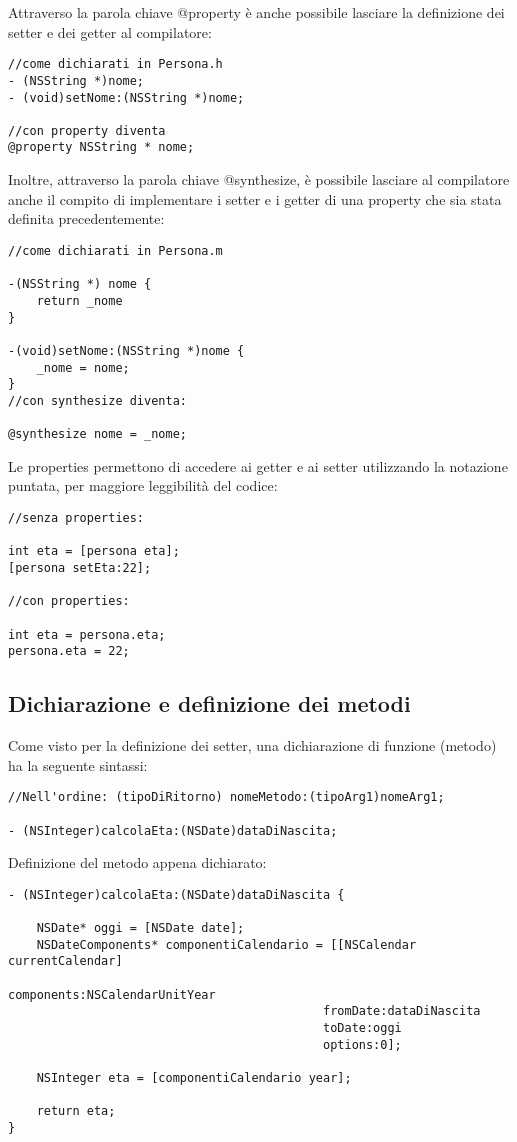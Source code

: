 \bigskip
\bigskip
\bigskip
Attraverso la parola chiave @property è anche possibile lasciare la definizione dei setter e dei getter al compilatore:
\lstset{language=[Objective]C, breakindent=40pt, breaklines}
\begin{lstlisting}
//come dichiarati in Persona.h
- (NSString *)nome;
- (void)setNome:(NSString *)nome;

//con property diventa
@property NSString * nome;
\end{lstlisting}
\bigskip
\bigskip
\bigskip
Inoltre, attraverso la parola chiave @synthesize, è possibile lasciare al compilatore anche il compito di implementare i setter e i getter di una property che sia stata definita precedentemente:
\lstset{language=[Objective]C, breakindent=40pt, breaklines}
\begin{lstlisting}
//come dichiarati in Persona.m

-(NSString *) nome {
	return _nome
}

-(void)setNome:(NSString *)nome {
	_nome = nome;
}
//con synthesize diventa:

@synthesize nome = _nome; 
\end{lstlisting}
Le properties permettono di accedere ai getter e ai setter utilizzando la notazione puntata, per maggiore leggibilità del codice:
\lstset{language=[Objective]C, breakindent=40pt, breaklines}
\begin{lstlisting}
//senza properties: 

int eta = [persona eta]; 
[persona setEta:22]; 

//con properties: 

int eta = persona.eta;
persona.eta = 22;
\end{lstlisting}
\newpage
\subsection{Dichiarazione e definizione dei metodi}
Come visto per la definizione dei setter, una dichiarazione di funzione (metodo) ha la seguente sintassi: 
\lstset{language=[Objective]C, breakindent=40pt, breaklines}
\begin{lstlisting}
//Nell'ordine: (tipoDiRitorno) nomeMetodo:(tipoArg1)nomeArg1;

- (NSInteger)calcolaEta:(NSDate)dataDiNascita;
\end{lstlisting}
Definizione del metodo appena dichiarato: 
\lstset{language=[Objective]C, breakindent=40pt, breaklines}
\begin{lstlisting}
- (NSInteger)calcolaEta:(NSDate)dataDiNascita {

	NSDate* oggi = [NSDate date];
	NSDateComponents* componentiCalendario = [[NSCalendar currentCalendar] 
                                   			components:NSCalendarUnitYear 
                                   			fromDate:dataDiNascita
                                   			toDate:oggi
                                   			options:0];
	
	NSInteger eta = [componentiCalendario year];
	
	return eta;
}
\end{lstlisting}
